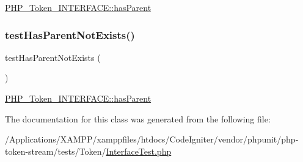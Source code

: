 \mbox{\hyperlink{class_p_h_p___token___i_n_t_e_r_f_a_c_e_af777a5920aced0a4e1678d9ab65f35f7}{P\+H\+P\+\_\+\+Token\+\_\+\+I\+N\+T\+E\+R\+F\+A\+C\+E\+::has\+Parent}} \mbox{\label{class_p_h_p___token___interface_test_a09f03df350b25541554b2778d46546eb}} 
\subsubsection{\texorpdfstring{test\+Has\+Parent\+Not\+Exists()}{testHasParentNotExists()}}
{\footnotesize\ttfamily test\+Has\+Parent\+Not\+Exists (\begin{DoxyParamCaption}{ }\end{DoxyParamCaption})}

\mbox{\hyperlink{class_p_h_p___token___i_n_t_e_r_f_a_c_e_af777a5920aced0a4e1678d9ab65f35f7}{P\+H\+P\+\_\+\+Token\+\_\+\+I\+N\+T\+E\+R\+F\+A\+C\+E\+::has\+Parent}} 

The documentation for this class was generated from the following file\+:\begin{DoxyCompactItemize}
\item 
/\+Applications/\+X\+A\+M\+P\+P/xamppfiles/htdocs/\+Code\+Igniter/vendor/phpunit/php-\/token-\/stream/tests/\+Token/\mbox{\hyperlink{_interface_test_8php}{Interface\+Test.\+php}}\end{DoxyCompactItemize}
